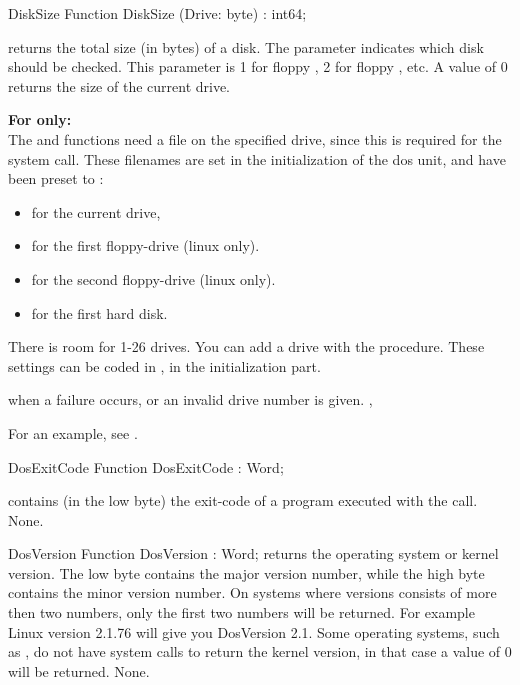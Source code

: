 \begin{function}{DiskSize}
\Declaration
Function DiskSize (Drive: byte) : int64;
\Description

 returns the total size (in bytes) of a disk. The parameter
 indicates which disk should be checked. This parameter is 1 for
floppy , 2 for floppy , etc. A value of 0 returns the size
of the current drive. 

\textbf{For \unix only:}\\
The  and  functions need a file on the specified drive, since this
is required for the  system call.
  These filenames are set in the initialization of the dos unit, and have 
been preset to :
\begin{itemize}
\item {} for the current drive, 
\item {} for the first floppy-drive (linux only).
\item {} for the second floppy-drive (linux only).
\item {} for the first hard disk.
\end{itemize}
There is room for 1-26 drives. You can add a drive with the
 procedure.
These settings can be coded in , in the initialization part.

 when a failure occurs, or an invalid drive number is given.
\SeeAlso
{}, 
\end{function}
For an example, see .
\begin{function}{DosExitCode}
\Declaration
Function DosExitCode  : Word;
\Description

 contains (in the low byte) the exit-code of a program 
executed with the  call.
\Errors
None.
\SeeAlso
{}
\end{function}


\begin{function}{DosVersion}
\Declaration
Function DosVersion  : Word;
\Description
{} returns the operating system or kernel version. The
low byte contains the major version number, while the high byte 
contains the minor version number.
\Portability
On systems where versions consists of more then two numbers, 
only the first two numbers will be returned. For example Linux version 2.1.76 
will give you DosVersion 2.1. Some operating systems, such as \freebsd, do not
have system calls to return the kernel version, in that case a value of 0 will
be returned.
\Errors
None.
\SeeAlso

\end{function}


